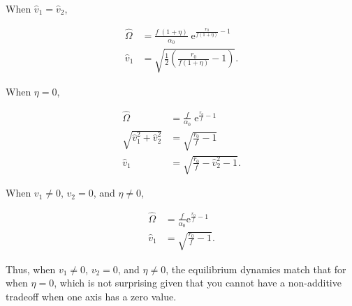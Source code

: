 When $\hat{v}_1 = \hat{v}_2$,

\begin{equation}  \label{eq:two-axes-finals-eta-negative}
\begin{split}
    \hat{\Omega} &= \frac{ f \; ( 1 + \eta ) }{ \alpha_0 } \;
        \textrm{e}^{\frac{  r_0 }{ f ( 1 + \eta ) } - 1 }
        \\
    \hat{v}_1 &= \sqrt{
        \frac{1}{2} \left( \frac{ r_0 }{ f (1 + \eta) } - 1 \right)
    }
    \textrm{.}
\end{split}
\end{equation}


\noindent When $\eta = 0$,

\begin{equation}  \label{eq:two-axes-finals-eta-zero}
\begin{split}
    \hat{\Omega} &= \frac{ f }{ \alpha_0 } \; \textrm{e}^{\frac{ r_0 }{ f } - 1 } \\
    \sqrt{\hat{v}_1^2 + \hat{v}_2^2} &= \sqrt{ \frac{ r_0 }{ f } - 1 } \\
    \hat{v}_1 &= \sqrt{ \frac{ r_0  }{ f } - \hat{v}_2^2 - 1 }
    \textrm{.}
\end{split}
\end{equation}


\noindent When $v_1 \ne 0$, $v_2 = 0$, and $\eta \ne 0$,

\begin{equation}  \label{eq:two-axes-finals-eta-positive}
\begin{split}
    \hat{\Omega} &= \frac{f}{\alpha_0} \textrm{e}^{\frac{r_0}{f} - 1} \\
    \hat{v}_1 &= \sqrt{ \frac{ r_0 }{ f } - 1 }
    \textrm{.}
\end{split}
\end{equation}

\noindent Thus, when $v_1 \ne 0$, $v_2 = 0$, and $\eta \ne 0$, the equilibrium
dynamics match that for when $\eta = 0$, which is not surprising given that
you cannot have a non-additive tradeoff when one axis has a zero value.

















